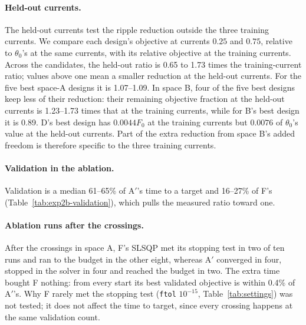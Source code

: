 \documentclass{anvil-paper}
\begin{document}
\paragraph{Held-out currents.}
The held-out currents test the ripple reduction outside the three training
currents. We compare each design's objective at currents $0.25$ and $0.75$,
relative to $\theta_0$'s at the same currents, with its relative objective
at the training currents. Across the candidates, the held-out ratio is 0.65
to 1.73 times the training-current ratio; values above one mean a smaller
reduction at the held-out currents. For the five best space-A designs it
is 1.07--1.09. In space B, four of the five best designs keep less of
their reduction: their remaining objective fraction at the held-out currents
is 1.23--1.73 times that at the training currents, while for B's best
design it is 0.89. D's best design has $0.0044F_0$ at the training currents but
$0.0076$ of $\theta_0$'s value at the held-out currents. Part of the extra
reduction from space B's added freedom is therefore specific to the three
training currents.

\begin{table}[tbp]\centering\small
\caption{Validation charges, repeat~1. ``To crossing'' counts the
validations up to and including the first attaining one, and ``share''
gives the fraction of the time to that target charged to validation, as
medians (ranges) over the method's attained targets and starts. ``Run''
gives the range over starts of the fraction of the whole run's charged time
spent in validation.}
\label{tab:exp2-validation}
\end{table}

\paragraph{Validation in the ablation.}
Validation is a median 61--65\% of A$'$'s time to
a target and 16--27\% of F's (Table~\ref{tab:exp2b-validation}), which
pulls the measured ratio toward one.

\paragraph{Ablation runs after the crossings.}
After the crossings in space A, F's SLSQP met its stopping test in two of ten runs and ran to the
budget in the other eight, whereas A$'$ converged in four, stopped in the
solver in four and reached the budget in two. The extra time bought F
nothing: from every start its best validated objective is within 0.4\% of
A$'$'s. Why F rarely met the stopping test (\texttt{ftol} $10^{-15}$,
Table~\ref{tab:settings}) was not tested; it does not affect the time to
target, since every crossing happens at the same validation count.
\end{document}
